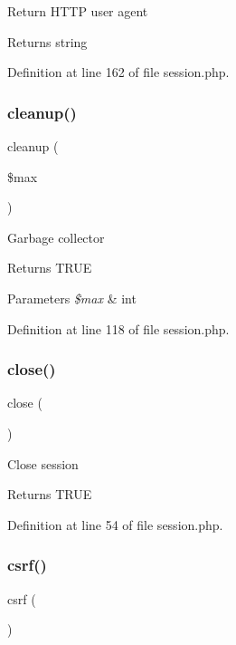 Return H\+T\+TP user agent \begin{DoxyReturn}{Returns}
string 
\end{DoxyReturn}


Definition at line 162 of file session.\+php.

\hypertarget{class_session_a60b027eb0df6d42b8fe2ec8c93cfbbae}{}\label{class_session_a60b027eb0df6d42b8fe2ec8c93cfbbae} 
\subsubsection{\texorpdfstring{cleanup()}{cleanup()}}
{\footnotesize\ttfamily cleanup (\begin{DoxyParamCaption}\item[{}]{\$max }\end{DoxyParamCaption})}

Garbage collector \begin{DoxyReturn}{Returns}
T\+R\+UE 
\end{DoxyReturn}

\begin{DoxyParams}{Parameters}
{\em \$max} & int \\
\hline
\end{DoxyParams}


Definition at line 118 of file session.\+php.

\hypertarget{class_session_aa69c8bf1f1dcf4e72552efff1fe3e87e}{}\label{class_session_aa69c8bf1f1dcf4e72552efff1fe3e87e} 
\subsubsection{\texorpdfstring{close()}{close()}}
{\footnotesize\ttfamily close (\begin{DoxyParamCaption}{ }\end{DoxyParamCaption})}

Close session \begin{DoxyReturn}{Returns}
T\+R\+UE 
\end{DoxyReturn}


Definition at line 54 of file session.\+php.

\hypertarget{class_session_a048d24aa22a28f92f1f3a7e3d323f45e}{}\label{class_session_a048d24aa22a28f92f1f3a7e3d323f45e} 
\subsubsection{\texorpdfstring{csrf()}{csrf()}}
{\footnotesize\ttfamily csrf (\begin{DoxyParamCaption}{ }\end{DoxyParamCaption})}

